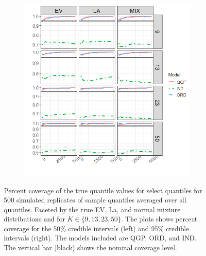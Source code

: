 \documentclass[preprint,12pt,authoryear]{elsarticle}
\begin{document}
\begin{figure}[hbt!]
\begin{subfigure}{.532\linewidth}
  \includegraphics[width=\linewidth]{Images/uk_cover95.png}
\end{subfigure}
\caption{Percent coverage of the true quantile values for select quantiles for 500 simulated replicates of sample quantiles averaged over all quantiles. Faceted by the true EV, La, and normal mixture distributions and for $K \in \{9, 13, 23, 50\}$. The plots shows percent coverage for the 50\% credible intervals (left) and 95\% credible intervals (right). The models included are QGP, ORD, and IND. The vertical bar (black) shows the nominal coverage level.}
\label{fig:uk_cover}
\end{figure}

\end{document}
